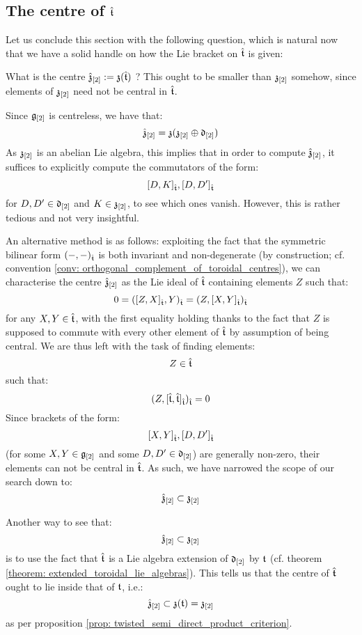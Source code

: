     \subsection{The centre of \texorpdfstring{$\hat{\mathfrak{t}}$}{}}
        Let us conclude this section with the following question, which is natural now that we have a solid handle on how the Lie bracket on $\hat{\mathfrak{t}}$ is given:
        \begin{question}
            What is the centre $\hat{\mathfrak{z}}_{[2]} := \mathfrak{z}( \hat{\mathfrak{t}} )$ ? This ought to be smaller than $\mathfrak{z}_{[2]}$ somehow, since elements of $\mathfrak{z}_{[2]}$ need not be central in $\hat{\mathfrak{t}}$. 
        \end{question}
        \begin{remark}
            Since $\mathfrak{g}_{[2]}$ is centreless, we have that:
                $$\hat{\mathfrak{z}}_{[2]} = \mathfrak{z}( \mathfrak{z}_{[2]} \oplus \mathfrak{d}_{[2]} )$$
            As $\mathfrak{z}_{[2]}$ is an abelian Lie algebra, this implies that in order to compute $\hat{\mathfrak{z}}_{[2]}$, it suffices to explicitly compute the commutators of the form:
                $$[D, K]_{\hat{\mathfrak{t}}}, [D, D']_{\hat{\mathfrak{t}}}$$
            for $D, D' \in \mathfrak{d}_{[2]}$ and $K \in \mathfrak{z}_{[2]}$, to see which ones vanish. However, this is rather tedious and not very insightful.
            
            An alternative method is as follows: exploiting the fact that the symmetric bilinear form $(-, -)_{\hat{\mathfrak{t}}}$ is both invariant and non-degenerate (by construction; cf. convention \ref{conv: orthogonal_complement_of_toroidal_centres}), we can characterise the centre $\hat{\mathfrak{z}}_{[2]}$ as the Lie ideal of $\hat{\mathfrak{t}}$ containing elements $Z$ such that:
                $$0 = ([Z, X]_{\hat{\mathfrak{t}}}, Y)_{\hat{\mathfrak{t}}} = (Z, [X, Y]_{\hat{\mathfrak{t}}})_{\hat{\mathfrak{t}}}$$
            for any $X, Y \in \hat{\mathfrak{t}}$, with the first equality holding thanks to the fact that $Z$ is supposed to commute with every other element of $\hat{\mathfrak{t}}$ by assumption of being central. We are thus left with the task of finding elements:
                $$Z \in \hat{\mathfrak{t}}$$
            such that:
                $$(Z, [\hat{\mathfrak{t}}, \hat{\mathfrak{t}}]_{\hat{\mathfrak{t}}})_{\hat{\mathfrak{t}}} = 0$$
            Since brackets of the form:
                $$[X, Y]_{\hat{\mathfrak{t}}}, [D, D']_{\hat{\mathfrak{t}}}$$
            (for some $X, Y \in \mathfrak{g}_{[2]}$ and some $D, D' \in \mathfrak{d}_{[2]}$) are generally non-zero, their elements can not be central in $\hat{\mathfrak{t}}$. As such, we have narrowed the scope of our search down to:
                $$\hat{\mathfrak{z}}_{[2]} \subset \mathfrak{z}_{[2]}$$

            Another way to see that:
                $$\hat{\mathfrak{z}}_{[2]} \subset \mathfrak{z}_{[2]}$$
            is to use the fact that $\hat{\mathfrak{t}}$ is a Lie algebra extension of $\mathfrak{d}_{[2]}$ by $\mathfrak{t}$ (cf. theorem \ref{theorem: extended_toroidal_lie_algebras}). This tells us that the centre of $\hat{\mathfrak{t}}$ ought to lie inside that of $\mathfrak{t}$, i.e.:
                $$\hat{\mathfrak{z}}_{[2]} \subset \mathfrak{z}(\mathfrak{t}) = \mathfrak{z}_{[2]}$$
            as per proposition \ref{prop: twisted_semi_direct_product_criterion}.
        \end{remark}
